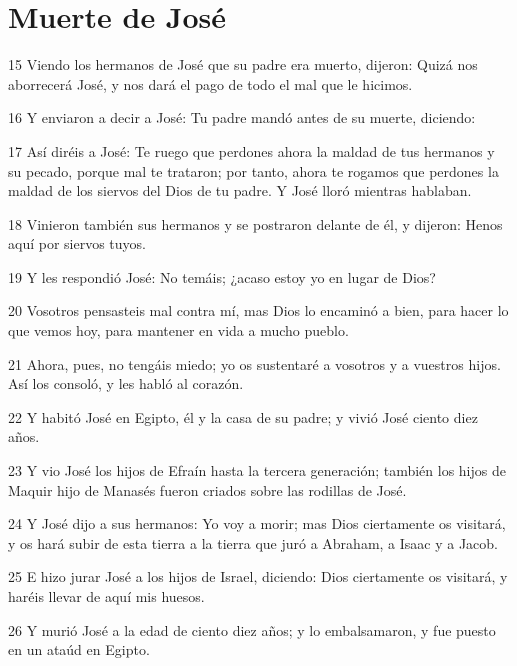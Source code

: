 \section*{Muerte de José}

\par 15 Viendo los hermanos de José que su padre era muerto, dijeron: Quizá nos aborrecerá José, y nos dará el pago de todo el mal que le hicimos.
\par 16 Y enviaron a decir a José: Tu padre mandó antes de su muerte, diciendo:
\par 17 Así diréis a José: Te ruego que perdones ahora la maldad de tus hermanos y su pecado, porque mal te trataron; por tanto, ahora te rogamos que perdones la maldad de los siervos del Dios de tu padre. Y José lloró mientras hablaban.
\par 18 Vinieron también sus hermanos y se postraron delante de él, y dijeron: Henos aquí por siervos tuyos.
\par 19 Y les respondió José: No temáis; ¿acaso estoy yo en lugar de Dios?
\par 20 Vosotros pensasteis mal contra mí, mas Dios lo encaminó a bien, para hacer lo que vemos hoy, para mantener en vida a mucho pueblo.
\par 21 Ahora, pues, no tengáis miedo; yo os sustentaré a vosotros y a vuestros hijos. Así los consoló, y les habló al corazón.
\par 22 Y habitó José en Egipto, él y la casa de su padre; y vivió José ciento diez años.
\par 23 Y vio José los hijos de Efraín hasta la tercera generación; también los hijos de Maquir hijo de Manasés fueron criados sobre las rodillas de José.
\par 24 Y José dijo a sus hermanos: Yo voy a morir; mas Dios ciertamente os visitará, y os hará subir de esta tierra a la tierra que juró a Abraham, a Isaac y a Jacob.
\par 25 E hizo jurar José a los hijos de Israel, diciendo: Dios ciertamente os visitará, y haréis llevar de aquí mis huesos.
\par 26 Y murió José a la edad de ciento diez años; y lo embalsamaron, y fue puesto en un ataúd en Egipto.


